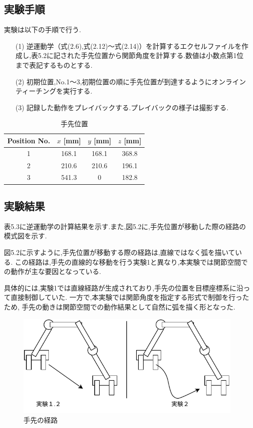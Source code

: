 \newpage

\subsection{実験手順}
実験は以下の手順で行う.

\begin{enumerate}
  \item[(1)] 逆運動学（式(2.6),式(2.12)～式(2.14)）を計算するエクセルファイルを作成し,表5.2に記された手先位置から関節角度を計算する.数値は小数点第1位まで表記するものとする.
  \item[(2)] 初期位置,No.1～3,初期位置の順に手先位置が到達するようにオンラインティーチングを実行する.
  \item[(3)] 記録した動作をプレイバックする.プレイバックの様子は撮影する.
\end{enumerate}

\begin{table}[h]
  \centering
  \caption{手先位置}
  \begin{tabular}{|c|c|c|c|}
    \hline
    Position No. & $x$ [mm] & $y$ [mm] & $z$ [mm] \\ \hline
    \hline
    1            & 168.1    & 168.1    & 368.8    \\ \hline
    2            & 210.6    & 210.6    & 196.1    \\ \hline
    3            & 541.3    & 0        & 182.8    \\ \hline
  \end{tabular}
\end{table}


\subsection{実験結果}
表5.3に逆運動学の計算結果を示す.また,図5.2に,手先位置が移動した際の経路の模式図を示す.

図5.2に示すように,手先位置が移動する際の経路は,直線ではなく弧を描いている.
この経路は,手先の直線的な移動を行う実験1と異なり,本実験では関節空間での動作が主な要因となっている.

具体的には,実験1では直線経路が生成されており,手先の位置を目標座標系に沿って直接制御していた.
一方で,本実験では関節角度を指定する形式で制御を行ったため,
手先の動きは関節空間での動作結果として自然に弧を描く形となった.

\begin{figure}[h]
  \centering
  \includegraphics[scale=1]{sozai/7.pdf}
  \caption{手先の経路}
\end{figure}

